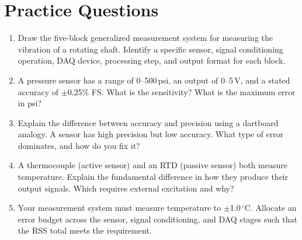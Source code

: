 \documentclass[11pt,letterpaper,twoside,openany]{book}
\newcommand{\degC}{\ensuremath{{}^{\circ}\text{C}}}
\begin{document}
\section{Practice Questions}
\begin{enumerate}[leftmargin=1.5em]
\item Draw the five-block generalized measurement system for measuring the vibration of a rotating shaft. Identify a specific sensor, signal conditioning operation, DAQ device, processing step, and output format for each block.
\item A pressure sensor has a range of 0--500\,psi, an output of 0--5\,V, and a stated accuracy of $\pm$0.25\% FS. What is the sensitivity? What is the maximum error in psi?
\item Explain the difference between accuracy and precision using a dartboard analogy. A sensor has high precision but low accuracy. What type of error dominates, and how do you fix it?
\item A thermocouple (active sensor) and an RTD (passive sensor) both measure temperature. Explain the fundamental difference in how they produce their output signals. Which requires external excitation and why?
\item Your measurement system must measure temperature to $\pm$1.0\,\degC{}. Allocate an error budget across the sensor, signal conditioning, and DAQ stages such that the RSS total meets the requirement.
\end{enumerate}
\end{document}

